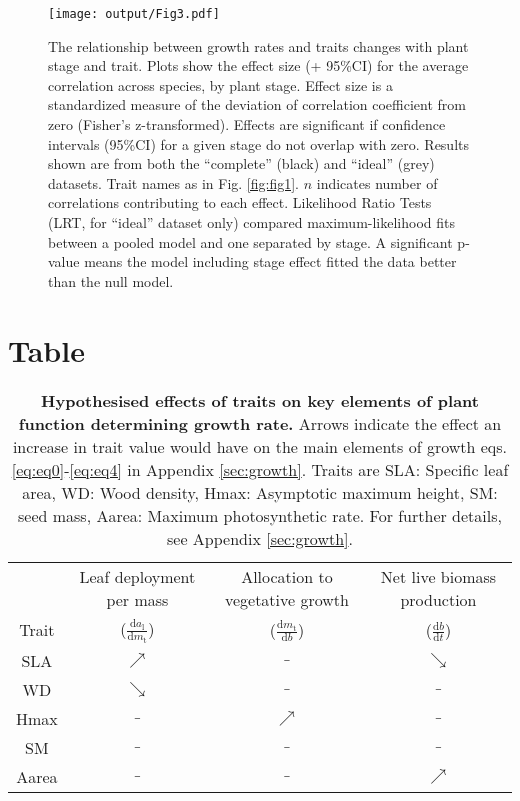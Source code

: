 \documentclass[a4paper]{article}\usepackage[]{graphicx}\usepackage[]{color}
\begin{document}
\begin{figure}[h!]
\centering
\texttt{[image: output/Fig3.pdf]}
\caption{The relationship between growth rates and traits changes with plant stage and trait. Plots show the effect size (+ 95\%CI) for the average correlation across species, by plant stage. Effect size is a standardized measure of the deviation of correlation coefficient from zero (Fisher's z-transformed). Effects are significant if confidence intervals (95\%CI) for a given stage do not overlap with zero. Results shown are from both the ``complete'' (black)  and ``ideal'' (grey) datasets. Trait names as in Fig. \ref{fig:fig1}. $n$ indicates number of correlations contributing to each effect. Likelihood Ratio Tests (LRT, for ``ideal'' dataset only) compared maximum-likelihood fits between a pooled model and one separated by stage. A significant p-value means the model including stage effect fitted the data better than the null model.
}
\label{fig:fig3}
\end{figure}

\clearpage
\section*{Table}
\setcounter{table}{0}
\begin{table}[h!]
\centering
\caption{\textbf{Hypothesised effects of traits on key elements of plant function determining growth rate.} Arrows indicate the effect an increase in trait value would have on the main elements of growth eqs. \ref{eq:eq0}-\ref{eq:eq4} in Appendix \ref{sec:growth}. Traits are SLA: Specific leaf area, WD: Wood density, Hmax: Asymptotic maximum height, SM: seed mass, Aarea: Maximum photosynthetic rate. For further details, see  Appendix \ref{sec:growth}.}
\vspace{1cm}
  \begin{tabular}{cccc}
   & Leaf deployment per mass & Allocation to vegetative growth & Net live biomass production \\
   Trait
    & ($\frac{\textrm{d}a_\textrm{l}}{\textrm{d}m_\textrm{t}}$)
    & ($\frac{\textrm{d}m_\textrm{t}}{\textrm{d}b}$)
    & ($\frac{\textrm{d}b}{\textrm{d}t}$) \\ \hline
  SLA &$\nearrow$ &$\_$ & $\searrow$  \\
  WD & $\searrow$ &$\_$  &$\_$ \\
  Hmax &$\_$ &$\nearrow$ &$\_$ \\
  SM &$\_$&$\_$&$\_$ \\
  Aarea &$\_$ &$\_$ & $\nearrow$ \\
\hline
  \end{tabular}
\label{tab:trade-offs}
  \end{table}
\end{document}
